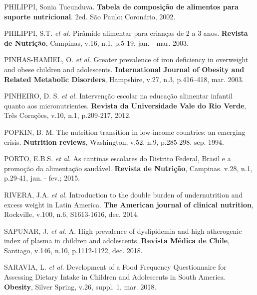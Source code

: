 \bigbreak

\noindent PHILIPPI, Sonia Tucunduva. \textbf{Tabela de composição de alimentos para suporte nutricional}. 2ed. São Paulo: Coronário, 2002.

\bigbreak

\noindent PHILIPPI, S.T. \textit{et al.} Pirâmide alimentar para crianças de 2 a 3 anos. \textbf{Revista de Nutrição}, Campinas, v.16, n.1, p.5-19, jan. - mar. 2003.

\bigbreak

\noindent PINHAS-HAMIEL, O. \textit{et al.} Greater prevalence of iron deficiency in overweight and obese children and adolescents. \textbf{International Journal of Obesity and Related Metabolic Disorders}, Hampshire, v.27, n.3, p.416–418, mar. 2003.

\bigbreak

\noindent PINHEIRO, D. S. \textit{et al.} Intervenção escolar na educação alimentar infantil quanto aos micronutrientes. \textbf{Revista da Universidade Vale do Rio Verde}, Três Corações, v.10, n.1, p.209-217, 2012.

\bigbreak

\noindent POPKIN, B. M. The nutrition transition in low‐income countries: an emerging crisis. \textbf{Nutrition reviews}, Washington, v.52, n.9, p.285-298. sep. 1994. 

\bigbreak

\noindent PORTO, E.B.S. \textit{et al.} As cantinas escolares do Distrito Federal, Brasil e a promoção da alimentação saudável. \textbf{Revista de Nutrição}, Campinas. v.28, n.1, p.29-41, jan. - fev.; 2015.

\bigbreak

\noindent RIVERA, J.A. \textit{et al.} Introduction to the double burden of undernutrition and excess weight in Latin America. \textbf{The American journal of clinical nutrition}, Rockville, v.100, n.6, S1613-1616, dec. 2014.

\bigbreak

\noindent SAPUNAR, J. \textit{et al.} A. High prevalence of dyslipidemia and high atherogenic index of plasma in children and adolescents. \textbf{Revista Médica de Chile}, Santiago, v.146, n.10, p.1112-1122, dec. 2018.

\bigbreak

\noindent SARAVIA, L. \textit{et al.} Development of a Food Frequency Questionnaire for Assessing Dietary Intake in Children and Adolescents in South America. \textbf{Obesity}, Silver Spring, v.26, suppl. 1, mar. 2018.

